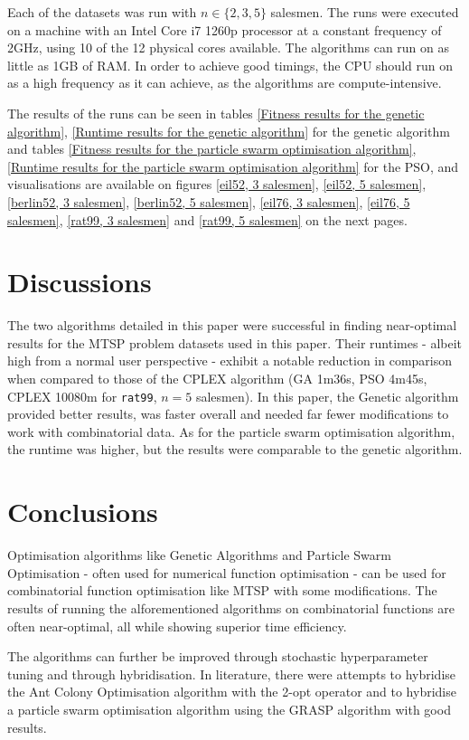 \documentclass[conference]{IEEEtran}
\begin{document}
Each of the datasets was run with $n \in \{2, 3, 5\}$ salesmen. The runs were executed on a machine with an Intel Core i7
1260p processor at a constant frequency of 2GHz, using 10 of the 12 physical cores available. The algorithms can run on as
little as 1GB of RAM. In order to achieve good timings, the CPU should run on as a high frequency as it can achieve, as the
algorithms are compute-intensive.

The results of the runs can be seen in tables \ref{Fitness results for the genetic algorithm},
\ref{Runtime results for the genetic algorithm} for the genetic algorithm and tables
\ref{Fitness results for the particle swarm optimisation algorithm}, \ref{Runtime results for the particle swarm optimisation algorithm}
for the PSO, and visualisations are available on figures \ref{eil52, 3 salesmen}, \ref{eil52, 5 salesmen}, \ref{berlin52, 3 salesmen},
\ref{berlin52, 5 salesmen}, \ref{eil76, 3 salesmen}, \ref{eil76, 5 salesmen}, \ref{rat99, 3 salesmen} and \ref{rat99, 5 salesmen}
on the next pages.

\section{Discussions}
The two algorithms detailed in this paper were successful in finding near-optimal results for the MTSP problem datasets used
in this paper. Their runtimes - albeit high from a normal user perspective - exhibit a notable reduction in comparison when
compared to those of the CPLEX algorithm (GA 1m36s, PSO 4m45s, CPLEX 10080m for \texttt{rat99}, $n = 5$ salesmen). In this paper,
the Genetic algorithm provided better results, was faster overall and needed far fewer modifications to work with combinatorial
data. As for the particle swarm optimisation algorithm, the runtime was higher, but the results were comparable to the genetic
algorithm.

\section{Conclusions}
Optimisation algorithms like Genetic Algorithms and Particle Swarm Optimisation - often used for numerical function optimisation -
can be used for combinatorial function optimisation like MTSP with some modifications. The results of running the alforementioned
algorithms on combinatorial functions are often near-optimal, all while showing superior time efficiency.

The algorithms can further be improved through stochastic hyperparameter tuning and through hybridisation. In literature, there were
attempts to hybridise the Ant Colony Optimisation algorithm with the 2-opt operator \cite{b12} and to hybridise a particle swarm
optimisation algorithm using the GRASP algorithm \cite{b8} with good results.
\end{document}
